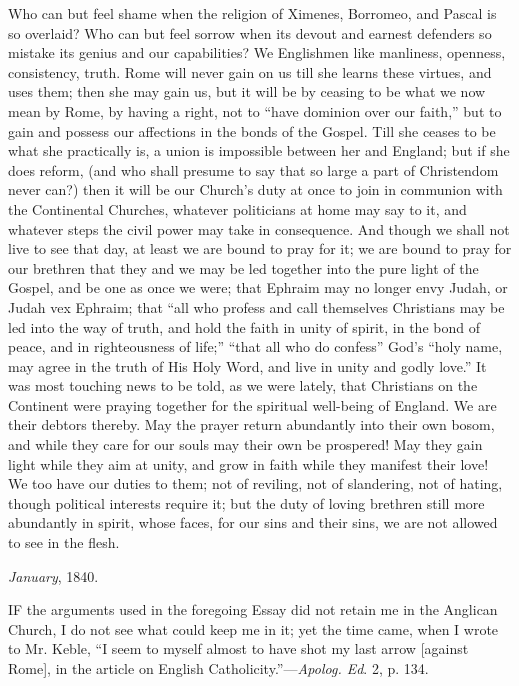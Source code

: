 Who can but feel shame when the religion of
Ximenes, Borromeo, and Pascal is so overlaid? Who can but feel sorrow
when its devout and earnest defenders so mistake its genius and our
capabilities? We Englishmen like manliness, openness, consistency,
truth. Rome will never gain on us till she learns these virtues, and
uses them; then she may gain us, but it will be by ceasing to be what
we now mean by Rome, by having a right, not to ``have dominion over
our faith,'' but to gain and possess our affections in the bonds of
the Gospel. Till she ceases to be what she practically is, a union is
impossible between her and England; but if she does reform, (and who
shall presume to say that so large a part of Christendom never can?)
then it will be our Church's duty at once to join in communion with
the Continental Churches, whatever politicians at home may say to it,
and whatever steps the civil power may take in consequence. And though
we shall not live to see that day, at least we are bound to pray for
it; we are bound to pray for our brethren that they and we may be led
together into the pure light of the Gospel, and be one as once we
were; that Ephraim may no longer envy Judah, or Judah vex Ephraim;
that ``all who profess and call themselves Christians may be led into
the way of truth, and hold the faith in unity of spirit, in the bond
of peace, and in righteousness of life;'' ``that all who do
confess'' God's ``holy name, may agree in the truth of His Holy
Word, and live in unity and godly love.'' It was most touching news
to be told, as we were lately, that Christians on the Continent were
praying together for the spiritual well-being of England. We are their
debtors thereby. May the prayer return abundantly into their own
bosom, and while they care for our souls may their own be prospered!
May they gain light while they aim at unity, and grow in faith while
they manifest their love! We too have our duties to them; not of
reviling, not of slandering, not of hating, though political interests
require it; but the duty of loving brethren still more abundantly in
spirit, whose faces, for our sins and their sins, we are not allowed
to see in the flesh.

\emph{January}, 1840.


IF the arguments used in the foregoing
Essay did not retain me in the Anglican Church, I do not see what
could keep me in it; yet the time came, when I wrote to Mr. Keble,
``I seem to myself almost to have shot my last arrow [against
Rome], in the article on English Catholicity.''—\emph{Apolog.
Ed}. 2, p. 134.

